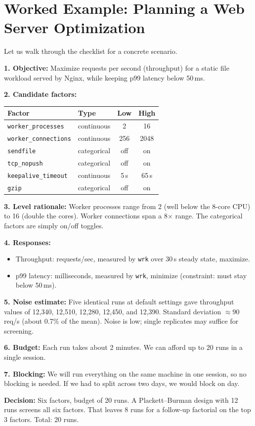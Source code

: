 \documentclass[11pt]{book}
\begin{document}
\section{Worked Example: Planning a Web Server Optimization}

Let us walk through the checklist for a concrete scenario.

\begin{example}
\textbf{1. Objective:} Maximize requests per second (throughput) for a static
file workload served by Nginx, while keeping p99 latency below 50\,ms.

\textbf{2. Candidate factors:}
\begin{center}
\begin{tabular}{llcc}
\toprule
Factor & Type & Low & High \\
\midrule
\texttt{worker\_processes} & continuous & 2 & 16 \\
\texttt{worker\_connections} & continuous & 256 & 2048 \\
\texttt{sendfile} & categorical & off & on \\
\texttt{tcp\_nopush} & categorical & off & on \\
\texttt{keepalive\_timeout} & continuous & 5\,s & 65\,s \\
\texttt{gzip} & categorical & off & on \\
\bottomrule
\end{tabular}
\end{center}

\textbf{3. Level rationale:} Worker processes range from 2 (well below the 8-core
CPU) to 16 (double the cores). Worker connections span a 8$\times$ range. The
categorical factors are simply on/off toggles.

\textbf{4. Responses:}
\begin{itemize}[nosep]
\item Throughput: requests/sec, measured by \texttt{wrk} over 30\,s steady state,
      maximize.
\item p99 latency: milliseconds, measured by \texttt{wrk}, minimize (constraint:
      must stay below 50\,ms).
\end{itemize}

\textbf{5. Noise estimate:} Five identical runs at default settings gave
throughput values of 12,340, 12,510, 12,280, 12,450, and 12,390. Standard
deviation $\approx 90$ req/s (about 0.7\% of the mean). Noise is low; single
replicates may suffice for screening.

\textbf{6. Budget:} Each run takes about 2 minutes. We can afford up to 20 runs
in a single session.

\textbf{7. Blocking:} We will run everything on the same machine in one session,
so no blocking is needed. If we had to split across two days, we would block on
day.

\textbf{Decision:} Six factors, budget of 20 runs. A Plackett--Burman design
with 12 runs screens all six factors. That leaves 8 runs for a follow-up
factorial on the top 3 factors. Total: 20 runs.
\end{example}
\end{document}

